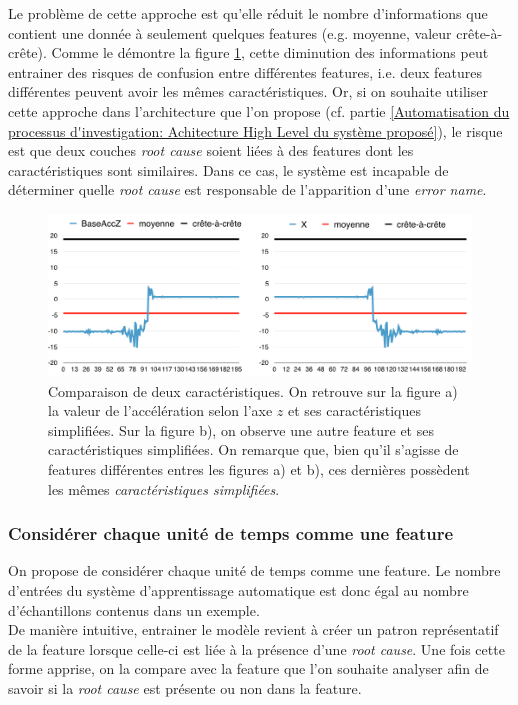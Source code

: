 Le problème de cette approche est qu'elle réduit le nombre d'informations que contient une donnée à seulement quelques features (e.g. moyenne, valeur crête-à-crête). Comme le démontre la figure \ref{fig:Comparaison de deux caractéristiques}, cette diminution des informations peut entrainer des risques de confusion entre différentes features, i.e. deux features différentes peuvent avoir les mêmes caractéristiques. Or, si on souhaite utiliser cette approche dans l'architecture que l'on propose (cf. partie \ref{Automatisation du processus d'investigation: Achitecture High Level du système proposé}), le risque est que deux couches \emph{root cause} soient liées à des features dont les caractéristiques sont similaires. Dans ce cas, le système est incapable de déterminer quelle \emph{root cause} est responsable de l'apparition d'une \emph{error name}.

\begin{figure}[h]
	\centering\includegraphics[width=15cm]{images/caracteristiques_simples_2.png}
	\caption[Comparaison de deux caractéristiques]{Comparaison de deux caractéristiques. On retrouve sur la figure a) la valeur de l'accélération selon l'axe $z$ et ses caractéristiques simplifiées. Sur la figure b), on observe une autre feature et ses caractéristiques simplifiées. On remarque que, bien qu'il s'agisse de features différentes entres les figures a) et b), ces dernières possèdent les mêmes \emph{caractéristiques simplifiées}.}
	\label{fig:Comparaison de deux caractéristiques}
\end{figure}

\subsubsection{Considérer chaque unité de temps comme une feature}
\label{Automatisation du processus d'investigation: Reconnaissance de motifs: Différentes approches étudiées: Considérer chaque unité de temps comme une feature}
On propose de considérer chaque unité de temps comme une feature. Le nombre d'entrées du système d'apprentissage automatique est donc égal au nombre d'échantillons contenus dans un exemple. \\
De manière intuitive, entrainer le modèle revient à créer un patron représentatif de la feature lorsque celle-ci est liée à la présence d'une \emph{root cause}. Une fois cette forme apprise, on la compare avec la feature que l'on souhaite analyser afin de savoir si la \emph{root cause} est présente ou non dans la feature.
\newline

